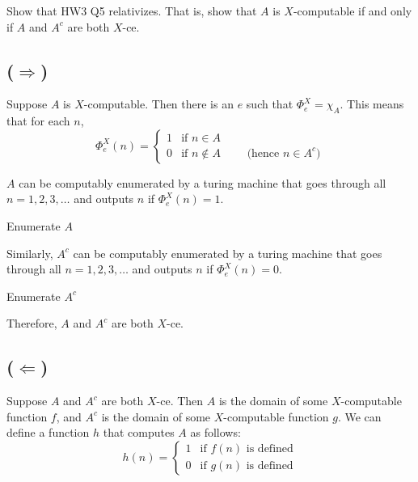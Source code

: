 \begin{problem}
  Show that HW3 Q5 relativizes.
  That is, show that $A$ is $X$-computable
  if and only if $A$ and $A^c$ are both $X$-ce.

  \begin{answer}
    \subsection*{($\Longrightarrow$)}
    Suppose $A$ is $X$-computable.
    Then there is an $e$ such that $\Phi_e^X = \chi_A$.
    This means that for each $n$,
    \[
      \Phi_e^X(n) = \begin{cases}
        1 & \text{if } n \in A \\
        0 & \text{if } n \not\in A \qquad \text{ (hence $n \in A^c$)}
      \end{cases}
    \]

    $A$ can be computably enumerated by a turing machine
    that goes through all $n = 1, 2, 3, \ldots$ and
    outputs $n$ if $\Phi_e^X(n) = 1$.

    \step
    \begin{algorithm}[H]
      \caption{Enumerate $A$}
    \end{algorithm}

    \step
    Similarly, $A^c$ can be computably enumerated by a turing machine
    that goes through all $n = 1, 2, 3, \ldots$ and
    outputs $n$ if $\Phi_e^X(n) = 0$.

    \step
    \begin{algorithm}[H]
      \caption{Enumerate $A^c$}
    \end{algorithm}

    \step
    Therefore, $A$ and $A^c$ are both $X$-ce.

    \clearpage

    \subsection*{($\Longleftarrow$)}
    Suppose $A$ and $A^c$ are both $X$-ce.
    Then $A$ is the domain of some $X$-computable function $f$,
    and $A^c$ is the domain of some $X$-computable function $g$.
    We can define a function $h$ that computes $A$ as follows:
    \[
      h(n) = \begin{cases}
        1 & \text{if } f(n) \text{ is defined} \\
        0 & \text{if } g(n) \text{ is defined}
      \end{cases}
    \]


\end{answer}
\end{problem}
